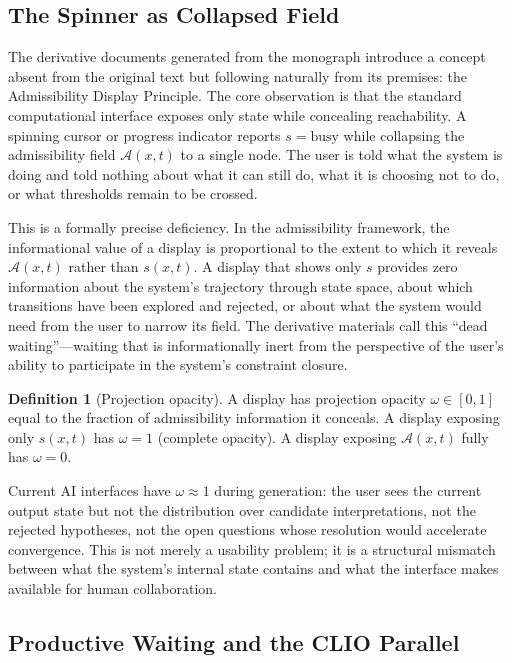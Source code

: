 \documentclass[12pt, a4paper]{article}
\theoremstyle{definition}
\newtheorem{defn}{Definition}[section]
\begin{document}
\subsection{The Spinner as Collapsed Field}

The derivative documents generated from the monograph introduce a concept absent from the original text but following naturally from its premises: the Admissibility Display Principle. The core observation is that the standard computational interface exposes only state while concealing reachability. A spinning cursor or progress indicator reports $s = \text{busy}$ while collapsing the admissibility field $\mathcal{A}(x,t)$ to a single node. The user is told what the system is doing and told nothing about what it can still do, what it is choosing not to do, or what thresholds remain to be crossed.

This is a formally precise deficiency. In the admissibility framework, the informational value of a display is proportional to the extent to which it reveals $\mathcal{A}(x,t)$ rather than $s(x,t)$. A display that shows only $s$ provides zero information about the system's trajectory through state space, about which transitions have been explored and rejected, or about what the system would need from the user to narrow its field. The derivative materials call this ``dead waiting''---waiting that is informationally inert from the perspective of the user's ability to participate in the system's constraint closure.

\begin{defn}[Projection opacity]
A display has projection opacity $\omega \in [0,1]$ equal to the fraction of admissibility information it conceals. A display exposing only $s(x,t)$ has $\omega = 1$ (complete opacity). A display exposing $\mathcal{A}(x,t)$ fully has $\omega = 0$.
\end{defn}

Current AI interfaces have $\omega \approx 1$ during generation: the user sees the current output state but not the distribution over candidate interpretations, not the rejected hypotheses, not the open questions whose resolution would accelerate convergence. This is not merely a usability problem; it is a structural mismatch between what the system's internal state contains and what the interface makes available for human collaboration.

\subsection{Productive Waiting and the CLIO Parallel}
\end{document}
